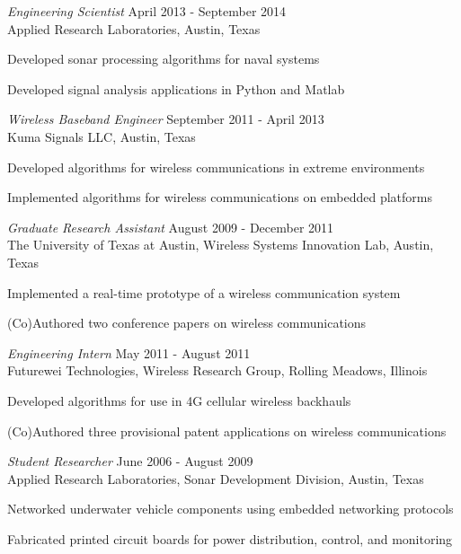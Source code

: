 \documentclass[line,margin=1in]{res}
\begin{document}
\begin{resume}
{\sl Engineering Scientist} \hfill April 2013 - September 2014 \\
Applied Research Laboratories, Austin, Texas
\begin{compactitem}
  \item Developed sonar processing algorithms for naval systems
  \item Developed signal analysis applications in Python and Matlab
\end{compactitem}

{\sl Wireless Baseband Engineer} \hfill September 2011 - April 2013 \\
Kuma Signals LLC, Austin, Texas
\begin{compactitem}  
  \item Developed algorithms for wireless communications in extreme environments
  \item Implemented algorithms for wireless communications on embedded platforms
\end{compactitem}

{\sl Graduate Research Assistant} \hfill August 2009 - December 2011 \\
The University of Texas at Austin, Wireless Systems Innovation Lab, Austin, Texas
\begin{compactitem}  
  \item Implemented a real-time prototype of a wireless communication system~\cite{massey2012implementation}
  \item (Co)Authored two conference papers on wireless communications~\cite{starr2011interference,massey2012implementation}
\end{compactitem}

{\sl Engineering Intern} \hfill May 2011 - August 2011 \\
Futurewei Technologies, Wireless Research Group, Rolling Meadows, Illinois
\begin{compactitem}  
  \item Developed algorithms for use in 4G cellular wireless backhauls
  \item (Co)Authored three provisional patent applications on wireless communications~\cite{truong2011designing,starr2011method,starr2011variable}
\end{compactitem}

{\sl Student Researcher} \hfill June 2006 - August 2009 \\
Applied Research Laboratories, Sonar Development Division, Austin, Texas
\begin{compactitem}
  \item Networked underwater vehicle components using embedded networking protocols
  \item Fabricated printed circuit boards for power distribution, control, and monitoring
\end{compactitem}


\end{resume}
\end{document}
